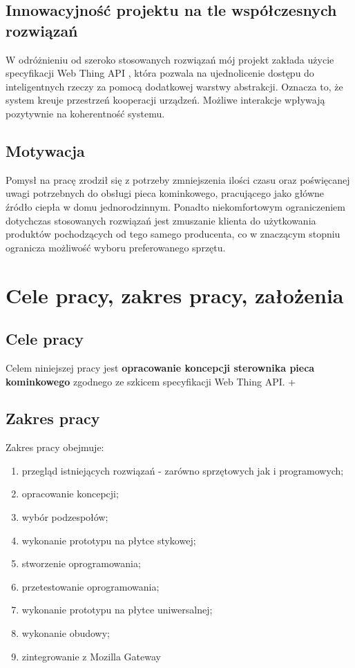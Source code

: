 \documentclass[11pt]{report}
\begin{document}
 \section{Innowacyjność projektu na tle współczesnych rozwiązań}
 W odróżnieniu od szeroko stosowanych rozwiązań mój projekt zakłada użycie specyfikacji Web Thing API \cite{WebThing2020}, która pozwala na ujednolicenie dostępu do inteligentnych rzeczy za pomocą dodatkowej warstwy abstrakcji. Oznacza to, że system kreuje przestrzeń kooperacji urządzeń. Możliwe interakcje wpływają pozytywnie na koherentność systemu.
 
 \section{Motywacja}
Pomysł na pracę zrodził się z potrzeby zmniejszenia ilości czasu oraz poświęcanej uwagi potrzebnych do obsługi pieca kominkowego, pracującego jako główne źródło ciepła w domu jednorodzinnym. Ponadto niekomfortowym ograniczeniem dotychczas stosowanych rozwiązań jest zmuszanie klienta do użytkowania produktów pochodzących od tego samego producenta, co w znaczącym stopniu ogranicza możliwość wyboru preferowanego sprzętu.

 \chapter{Cele pracy, zakres pracy, założenia}

 \section{Cele pracy}
 Celem niniejszej pracy jest \textbf{opracowanie koncepcji sterownika pieca kominkowego} zgodnego ze szkicem specyfikacji Web Thing API.
 +
 \section{Zakres pracy}
 Zakres pracy obejmuje:
 \begin{enumerate}
 \item przegląd istniejących rozwiązań - zarówno sprzętowych jak i programowych;
 \item opracowanie koncepcji;
 \item wybór podzespołów;
 \item wykonanie prototypu na płytce stykowej;
 \item stworzenie oprogramowania;
 \item przetestowanie oprogramowania; 
 \item wykonanie prototypu na płytce uniwersalnej;
 \item wykonanie obudowy;
 \item zintegrowanie z Mozilla Gateway
 \end{enumerate}
 
\end{document}
